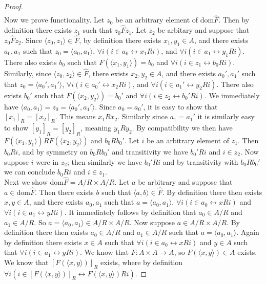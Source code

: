 \documentclass{report}
\begin{document}
\begin{proof}
\begin{align*}
\end{align*}
Now we prove functionality. Let $z_0$ be an arbitrary element of dom$\hat F$. Then by definition there exists $z_1$ such that $z_0\hat Fz_1$. Let $z_2$ be arbitary and suppose that $z_0\hat Fz_2$.
Since $\langle z_0,z_1\rangle\in\hat F$, by definition there exists $x_1,y_1\in A$, and there exists $a_0,a_1$ such that $z_0=\langle a_0,a_1\rangle$, $\forall i(i\in a_0\leftrightarrow x_1Ri)$,
and $\forall i(i\in a_1\leftrightarrow y_1Ri)$. There also exists $b_0$ such that $F(\langle x_1,y_1\rangle)=b_0$ and $\forall i(i\in z_1\leftrightarrow b_0Ri)$. 
Similarly, since $\langle z_0,z_2\rangle\in\hat F$, there exists $x_2,y_2\in A$, and there exists $a_0',a_1'$ such that $z_0=\langle a_0',a_1'\rangle$, $\forall i(i\in a_0'\leftrightarrow x_2Ri)$,
and $\forall i(i\in a_1'\leftrightarrow y_2Ri)$. There also exists $b_0'$ such that $F(\langle x_2,y_2\rangle)=b_0'$ and $\forall i(i\in z_2\leftrightarrow b_0'Ri)$. We immediately have
$\langle a_0,a_1\rangle=z_0=\langle a_0',a_1'\rangle$.
Since $a_0=a_0'$, it is easy to show that $[x_1]_R=[x_2]_R$. This means $x_1Rx_2$. Similarly since $a_1=a_1'$ it is similarly easy to show $[y_1]_R=[y_2]_R$, meaning $y_1Ry_2$. By compatibility
we then have $F(\langle x_1,y_1\rangle)RF(\langle x_2,y_2\rangle)$ and $b_0Rb_0'$. Let $i$ be an arbitrary element of $z_1$. Then $b_0Ri$, and by symmetry on $b_0Rb_0'$ and transitivity we have
$b_0'Ri$ and $i\in z_2$. Now suppose $i$ were in $z_2$; then similarly we have $b_0'Ri$ and by transitivity with $b_0Rb_0'$ we can conclude $b_0Ri$ and $i\in z_1$.\\
\indent Next we show dom$\hat F=A/R\times A/R$. Let $a$ be arbitrary and suppose that $a\in\text{dom}\hat F$. Then there exists $b$ such that $\langle a,b\rangle\in\hat F$. By definition there then
exists $x,y\in A$, and there exists $a_0,a_1$ such that $a=\langle a_0,a_1\rangle$, 
$\forall i(i\in a_0\leftrightarrow xRi)$ and $\forall i(i\in a_1\leftrightarrow yRi)$. It immediately follows by definition that $a_0\in A/R$ and $a_1\in A/R$. 
So $a=\langle a_0,a_1\rangle\in A/R\times A/R$. Now suppose $a\in A/R\times A/R$. By definition there then exists $a_0\in A/R$ and $a_1\in A/R$ such that $a=\langle a_0,a_1\rangle$.
Again by definition there exists $x\in A$ such that $\forall i(i\in a_0\leftrightarrow xRi)$ and $y\in A$ such that $\forall i(i\in a_1\leftrightarrow yRi)$. We know that $F:A\times A\to A$, so
$F(\langle x,y\rangle)\in A$ exists. We know that $[F(\langle x,y\rangle)]_R$ exists, where by definition $\forall i(i\in[F(\langle x,y\rangle)]_R\leftrightarrow F(\langle x,y\rangle)Ri)$.

\end{proof}
\end{document}
